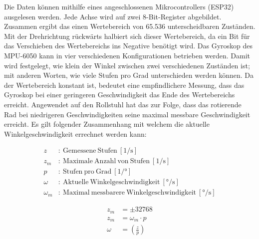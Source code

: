 Die Daten können mithilfe eines angeschlossenen Mikrocontrollers (ESP32) ausgelesen werden.
Jede Achse wird auf zwei 8-Bit-Register abgebildet\cite{invensenseinc.MPU6000MPU6050Register2013}.
Zusammen ergibt das einen Wertebereich von 65.536 unterscheidbaren Zuständen.
Mit der Drehrichtung rückwärts halbiert sich dieser Wertebereich, da ein Bit für das Verschieben des Wertebereichs ins Negative benötigt wird.
Das Gyroskop des MPU-6050 kann in vier verschiedenen Konfigurationen betrieben werden\cite{invensenseinc.MPU6000MPU6050Register2013}.
Damit wird festgelegt, wie klein der Winkel zwischen zwei verschiedenen Zuständen ist; mit anderen Worten, wie viele Stufen pro Grad unterschieden werden können.
Da der Wertebereich konstant ist, bedeutet eine empfindlichere Messung, dass das Gyroskop bei einer geringeren Geschwindigkeit das Ende des Wertebereichs erreicht.
Angewendet auf den Rollstuhl hat das zur Folge, dass das rotierende Rad bei niedrigeren Geschwindigkeiten seine maximal messbare Geschwindigkeit erreicht.
Es gilt folgender Zusammenhang mit welchem die aktuelle Winkelgeschwindigkeit errechnet werden kann:

\begin{align}
    z        & : \ \mathrm{Gemessene\ Stufen}\ [\si{1/\second}]                                \\
    z_m      & : \ \mathrm{Maximale\ Anzahl\ von\ Stufen}\ [\si{1/\second}]                    \\
    p        & : \ \mathrm{Stufen\ pro\ Grad}\ [\si{1/\degree}]                                \\
    \omega   & : \ \mathrm{Aktuelle\ Winkelgeschwindigkeit}\ [\si{\degree/\second}]            \\
    \omega_m & : \ \mathrm{Maximal\ messbarere\ Winkelgeschwindigkeit}\ [\si{\degree/\second}]
\end{align}

\begin{align}
    z_m    & = \pm 32768                  \\
    z_m    & = \omega_m \cdot p           \\
    \omega & = \left(\frac {z} {p}\right)
\end{align}

